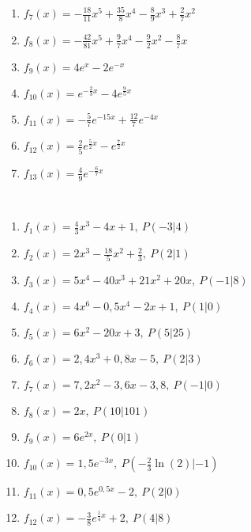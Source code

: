\documentclass[a4paper,12pt, headsepline, ngerman]{scrartcl}
\theoremstyle{definition}
\begin{document}
\begin{minipage}{\textwidth}
\begin{minipage}{.4\textwidth}
\begin{Exercise}[title={\raggedright Bestimme jeweils alle Stammfunktionen.}, label=stammfunktionenA2]
\begin{enumerate}[label=\alph*)]
		\item \(f_7(x)=-\frac{18}{11}x^5+\frac{35}{8}x^4-\frac{8}{9}x^3+\frac{2}{7}x^2\)
		\item \(f_8(x)=-\frac{42}{81}x^5+\frac{9}{7}x^4-\frac{9}{2}x^2-\frac{8}{7}x\)
		\item \(f_9(x)=4e^x-2e^{-x}\)
		\item \(f_{10}(x)=e^{-\frac{2}{3}x}-4e^{\frac{9}{5}x}\)
		\item \(f_{11}(x)=-\frac{5}{7}e^{-15x}+\frac{12}{7}e^{-4x}\)
		\item \(f_{12}(x)=\frac{2}{5}e^{\frac{5}{2}x}-e^{\frac{7}{2}x}\)
		\item \(f_{13}(x)=\frac{4}{9}e^{-\frac{6}{7}x}\)
	\end{enumerate}
\end{Exercise}
\end{minipage}
\end{minipage}
\begin{Exercise}[title={\raggedright Bestimme jeweils die Stammfunktion, deren Schaubild durch den angegebenen Punkt P verläuft.}, label=stammfunktionenA3]\\
	\begin{minipage}{.5\textwidth}
			\begin{enumerate}[label=\alph*)]
			\item \(f_1(x)=\frac{4}{3}x^3-4x+1,\ P(-3|4)\)
			\item \(f_2(x)=2x^3-\frac{18}{5}x^2+\frac{2}{3},\ P(2|1)\)
			\item \(f_3(x)=5x^4-40x^3+21x^2+20x,\ P(-1|8)\)
			\item \(f_4(x)=4x^6-0,5x^4-2x+1,\ P(1|0)\)
			\item \(f_5(x)=6x^2-20x+3,\ P(5|25)\)
			\item \(f_6(x)=2,4x^3+0,8x-5,\ P(2|3)\)
		\end{enumerate}
	\end{minipage}
	\begin{minipage}{.5\textwidth}
	\begin{enumerate}[label=\alph*)]
		\setcounter{enumi}{6}
		\item \(f_7(x)=7,2x^2-3,6x-3,8,\ P(-1|0)\)
		\item \(f_8(x)=2x,\ P(10|101)\)
		\item \(f_9(x)=6e^{2x},\ P(0|1)\)%
		\item \(f_{10}(x)=1,5e^{-3x},\ P(-\frac{2}{3}\ln(2)|-1)\)
		\item \(f_{11}(x)=0,5e^{0,5x}-2,\ P(2|0)\)
		\item \(f_{12}(x)=-\frac{3}{8}e^{\frac{1}{4}x}+2,\ P(4|8)\)
	\end{enumerate}
\end{minipage}
\end{Exercise}
\end{document}
